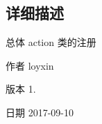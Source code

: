 \subsection{详细描述}
总体 action 类的注册 

\begin{DoxyAuthor}{作者}
loyxin 
\end{DoxyAuthor}
\begin{DoxyVersion}{版本}
1. 
\end{DoxyVersion}
\begin{DoxyDate}{日期}
2017-\/09-\/10 
\end{DoxyDate}
